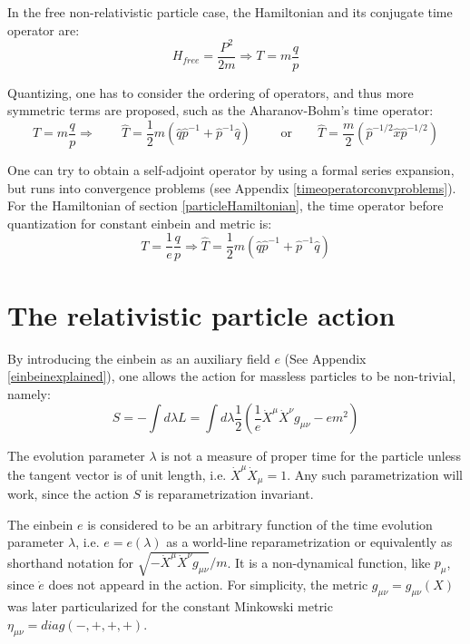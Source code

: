 \documentclass[a4paper,10pt]{article}
\numberwithin{equation}{section}
\begin{document}
In the free non-relativistic particle case, the Hamiltonian and its conjugate time operator are:
\begin{equation}
    H_{free} = \frac{P^2}{2m} \Rightarrow T = m\frac{q}{p}
\end{equation}

Quantizing, one has to consider the ordering of operators, and thus more symmetric terms are proposed, such as the Aharanov-Bohm's time operator:
\begin{equation}
T = m \dfrac{q}{p} \Rightarrow \qquad \hat{T} = \dfrac{1}{2}m \left( \hat{q}\hat{p}^{-1} + \hat{p}^{-1}\hat{q}\right) \qquad \text{ or} \qquad \hat{T} = \dfrac{m}{2} \left( \hat{p}^{-1/2} \hat{x} \hat{p}^{-1/2} \right)
\end{equation}

One can try to obtain a self-adjoint operator by using a formal series expansion, but runs into convergence problems (see Appendix \ref{timeoperatorconvproblems}). For the Hamiltonian of section \ref{particleHamiltonian}, the time operator before quantization for constant einbein and metric is:
\begin{equation}
T = \frac{1}{e} \frac{q}{p} \Rightarrow \hat{T} = \frac{1}{2}m \left( \hat{q} \hat{p}^{-1} + \hat{p}^{-1}\hat{q} \right)
\label{constanttimeoperator}
\end{equation}

\newpage


\section{The relativistic particle action}

\label{sec:relaprticleaction}

By introducing the einbein as an auxiliary field $e$ (See Appendix \ref{einbeinexplained}), one allows the action for massless particles to be non-trivial, namely:
\begin{equation}
    S = -\int d\lambda L = \int d\lambda \frac{1}{2} \left(\frac{1}{e} \dot{X}^{\mu}\dot{X}^{\nu}g_{\mu \nu} - e m^2 \right)
    \label{action}
\end{equation}

The evolution parameter $\lambda$ is not a measure of proper time for the particle unless the tangent vector is of unit length, i.e. $\dot{X}^\mu \dot{X}_\mu =1$. Any such parametrization will work, since the action $S$ is reparametrization invariant.

The einbein $e$ is considered to be an arbitrary function of the time evolution parameter $\lambda$, i.e. $e = e(\lambda)$ as a world-line reparametrization or equivalently as shorthand notation for $\sqrt{-\dot{X}^{\mu}\dot{X}^{\nu}g_{\mu \nu}}/m$. It is a non-dynamical function, like $p_\mu$, since $\dot{e}$ does not appeard in the action. For simplicity, the metric $g_{\mu \nu} = g_{\mu \nu}(X)$ was later particularized for the constant Minkowski metric $\eta_{\mu\nu} = diag(-,+,+,+)$.
\end{document}
